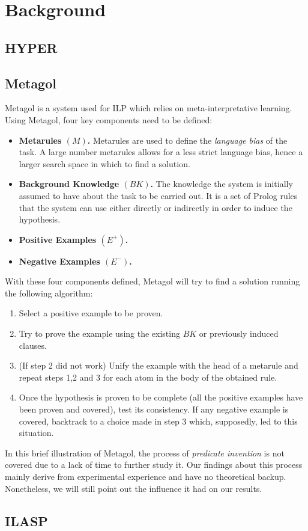 \section{Background}\label{sec:back}

\subsection{HYPER}
\subsection{Metagol}
Metagol is a system used for ILP which relies on meta-interpretative learning.\\
Using Metagol, four key components need to be defined:
\begin{itemize}
    \item \textbf{Metarules \((M)\).} Metarules are used to define the \emph{language bias} of the task. A large number metarules allows for a less strict language bias, hence a larger search space in which to find a solution. 
    \item \textbf{Background Knowledge \((BK)\).} The knowledge the system is initially assumed to have about the task to be carried out. It is a set of Prolog rules that the system can use either directly or indirectly in order to induce the hypothesis.
    \item \textbf{Positive Examples \((E^+)\).}
    \item \textbf{Negative Examples \((E^-)\).}
\end{itemize}
With these four components defined, Metagol will try to find a solution running the following algorithm:
\begin{enumerate}
    \item Select a positive example to be proven.
    \item Try to prove the example using the existing \(BK\) or previously induced clauses.
    \item (If step 2 did not work) Unify the example with the head of a metarule and repeat steps 1,2 and 3 for each atom in the body of the obtained rule.
    \item Once the hypothesis is proven to be complete (all the positive examples have been proven and covered), test its consistency. If any negative example is covered, backtrack to a choice made in step 3 which, supposedly, led to this situation.
\end{enumerate}
In this brief illustration of Metagol, the process of \emph{predicate invention} is not covered due to a lack of time to further study it. Our findings about this process mainly derive
from experimental experience and have no theoretical backup. Nonetheless, we will still point out the influence it had on our results.


\subsection{ILASP}

